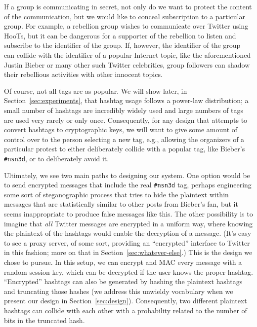 If a group is communicating in secret, not only do we want to
protect the content of the communication, but we would like to conceal
subscription to a particular group. For example, a rebellion group
wishes to communicate over Twitter using HooTs, but it can be
dangerous for a supporter of the rebellion to listen and subscribe to
the identifier of the group. If, however, the identifier of the group
can collide with the identifier of a popular Internet topic, like the aforementioned
Justin Bieber or many other such Twitter celebrities, group followers
can shadow their rebellious activities with other innocent topics.

Of course, not all tags are as popular. We will show later, in Section~\ref{sec:experiments}, that hashtag usage follows a power-law distribution; a small number of hashtags are incredibly widely used and large numbers of tags are used very rarely or only once. Consequently, for any design that attempts to convert hashtags to cryptographic keys, we will want to give some amount of control over to the person selecting a new tag, e.g., allowing the organizers of a particular protest to either deliberately collide with a popular tag, like Bieber's {\tt \#nsn3d}, or to deliberately avoid it.

Ultimately, we see two main paths to designing our system. One option would be to send encrypted messages that include the real {\tt \#nsn3d} tag, perhaps engineering some sort of steganographic process that tries to hide the plaintext within messages that are statistically similar to other posts from Bieber's fan, but it seems inappropriate to produce false messages like this. The other possibility is to imagine that {\em all} Twitter messages are encrypted in a uniform way, where knowing the plaintext of the hashtags would enable the decryption of a message. (It's easy to see a proxy server, of some sort, providing an ``encrypted'' interface to Twitter in this fashion; more on that in Section~\ref{sec:whatever-else}.) This is the design we chose to pursue. In this setup, we can encrypt and MAC every message with a random session key, which can be decrypted if the user knows the proper hashtag. ``Encrypted'' hashtags can also be generated by hashing the plaintext hashtags and truncating those hashes (we address this unwieldy vocabulary when we present our design in Section~\ref{sec:design}). Consequently, two different plaintext hashtags can collide with each other with a probability related to the number of bits in the truncated hash.

